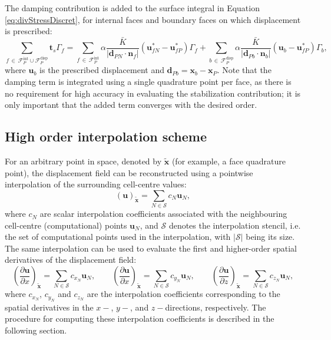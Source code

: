 \documentclass[sn-mathphys,Numbered]{sn-jnl}%
\newcommand{\bb}{\boldsymbol}
\begin{document}
The damping contribution is added to the surface integral in Equation \eqref{eq:divStressDiscret}, for internal faces and boundary faces on which displacement is prescribed:
\begin{equation}
\sum_{f \,\in\, \mathcal{F}_P^{\text{int}} \cup \mathcal{F}_P^{\text{disp}}} \bb{t}_s \Gamma_f =  
\sum_{f \,\in\, \mathcal{F}_P^{\text{int}}}  \alpha \frac{\bar{K}}{|\bb{d}_{PN} \cdot \bb{n}_f|}(\bb{u}_{fN}^*-\bb{u}_{fP}^*)\Gamma_f 
+ 
\sum_{b \,\in\, \mathcal{F}_P^{\text{disp}}}  \alpha \frac{\bar{K}}{|\bb{d}_{Pb} \cdot \bb{n}_b|}(\bb{u}_{b}-\bb{u}_{fP}^*)\Gamma_b,
\end{equation}
where $\bb{u}_{b}$ is the prescribed displacement and $\bb{d}_{Pb}=\bb{x}_b - \bb{x}_P$. Note that the damping term is integrated using a single quadrature point per face, as there is no requirement for high accuracy in evaluating the stabilization contribution; it is only important that the added term converges with the desired order.
%
\subsection{High order interpolation scheme}
\label{sec:ho_scheme}
%
For an arbitrary point in space, denoted by $\tilde{\bb{x}}$ (for example, a face quadrature point), the displacement field can be reconstructed using a pointwise interpolation of the surrounding cell-centre values:
%
\begin{equation}\label{eq:interp}
(\bb{u})_{\tilde{\bb{x}}} = \sum_{N \in \mathcal{S}}c_N \bb{u}_N,
\end{equation}
%
where $c_N$ are scalar interpolation coefficients associated with the neighbouring cell-centre (computational) points $\bb{u}_N$, and $\mathcal{S}$ denotes the interpolation stencil, i.e. the set of computational points used in the interpolation, with $|\mathcal{S}|$ being its size.
The same interpolation can be used to evaluate the first and higher-order spatial derivatives of the displacement field:
%
\begin{equation}\label{eq:derInterp}
\left(\frac{\partial \bb{u}}{\partial x}\right)_{\tilde{\bb{x}}}=\sum_{N \in \mathcal{S}}c_{x_N} \bb{u}_N, \qquad
\left(\frac{\partial \bb{u}}{\partial x}\right)_{\tilde{\bb{x}}}=\sum_{N \in \mathcal{S}}c_{y_N} \bb{u}_N, \qquad
\left(\frac{\partial \bb{u}}{\partial z}\right)_{\tilde{\bb{x}}}=\sum_{N \in \mathcal{S}}c_{z_N} \bb{u}_N, 
\end{equation}
%
where $c_{x_N}$, $c_{y_N}$ and $c_{z_N}$ are the interpolation coefficients corresponding to the spatial derivatives in the $x-$, $y-$, and $z-$directions, respectively.
The procedure for computing these interpolation coefficients is described in the following section.
%
\end{document}
